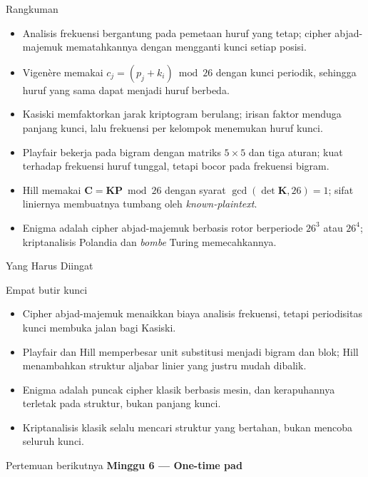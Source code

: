 \documentclass[aspectratio=169,11pt]{beamer}
\begin{document}
\begin{frame}{Rangkuman}
    \footnotesize
    \begin{itemize}
        \item Analisis frekuensi bergantung pada pemetaan huruf yang tetap;
              cipher abjad-majemuk mematahkannya dengan mengganti kunci setiap
              posisi.
        \item Vigen\`ere memakai
              $c_j=(p_j+k_i)\bmod26$ dengan kunci periodik, sehingga huruf
              yang sama dapat menjadi huruf berbeda.
        \item Kasiski memfaktorkan jarak kriptogram berulang; irisan faktor
              menduga panjang kunci, lalu frekuensi per kelompok menemukan
              huruf kunci.
        \item Playfair bekerja pada bigram dengan matriks $5\times5$ dan tiga
              aturan; kuat terhadap frekuensi huruf tunggal, tetapi bocor pada
              frekuensi bigram.
        \item Hill memakai $\mathbf{C}=\mathbf{KP}\bmod26$ dengan syarat
              $\gcd(\det\mathbf{K},26)=1$; sifat liniernya membuatnya tumbang
              oleh \textit{known-plaintext}.
        \item Enigma adalah cipher abjad-majemuk berbasis rotor berperiode
              $26^3$ atau $26^4$; kriptanalisis Polandia dan \textit{bombe}
              Turing memecahkannya.
    \end{itemize}
\end{frame}

\begin{frame}{Yang Harus Diingat}
    \begin{block}{Empat butir kunci}
        \begin{itemize}
            \item Cipher abjad-majemuk menaikkan biaya analisis frekuensi,
                  tetapi periodisitas kunci membuka jalan bagi Kasiski.
            \item Playfair dan Hill memperbesar unit substitusi menjadi bigram
                  dan blok; Hill menambahkan struktur aljabar linier yang
                  justru mudah dibalik.
            \item Enigma adalah puncak cipher klasik berbasis mesin, dan
                  kerapuhannya terletak pada struktur, bukan panjang kunci.
            \item Kriptanalisis klasik selalu mencari struktur yang bertahan,
                  bukan mencoba seluruh kunci.
        \end{itemize}
    \end{block}
    \vspace{0.25cm}
    \begin{exampleblock}{Pertemuan berikutnya}
        \textbf{Minggu 6 --- One-time pad}
    \end{exampleblock}
\end{frame}
\end{document}
